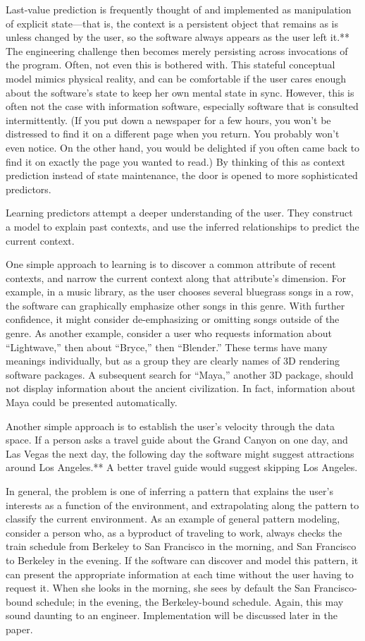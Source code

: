 {Last-value prediction is frequently thought of and implemented as manipulation of explicit state—that is, the context is a persistent object that remains as is unless changed by the user, so the software always appears as the user left it.** The engineering challenge then becomes merely persisting across invocations of the program. Often, not even this is bothered with. This stateful conceptual model mimics physical reality, and can be comfortable if the user cares enough about the software’s state to keep her own mental state in sync. However, this is often not the case with information software, especially software that is consulted intermittently. (If you put down a newspaper for a few hours, you won’t be distressed to find it on a different page when you return. You probably won’t even notice. On the other hand, you would be delighted if you often came back to find it on exactly the page you wanted to read.) By thinking of this as context prediction instead of state maintenance, the door is opened to more sophisticated predictors.

Learning predictors attempt a deeper understanding of the user. They construct a model to explain past contexts, and use the inferred relationships to predict the current context.

One simple approach to learning is to discover a common attribute of recent contexts, and narrow the current context along that attribute’s dimension. For example, in a music library, as the user chooses several bluegrass songs in a row, the software can graphically emphasize other songs in this genre. With further confidence, it might consider de-emphasizing or omitting songs outside of the genre. As another example, consider a user who requests information about “Lightwave,” then about “Bryce,” then “Blender.” These terms have many meanings individually, but as a group they are clearly names of 3D rendering software packages. A subsequent search for “Maya,” another 3D package, should not display information about the ancient civilization. In fact, information about Maya could be presented automatically.

Another simple approach is to establish the user’s velocity through the data space. If a person asks a travel guide about the Grand Canyon on one day, and Las Vegas the next day, the following day the software might suggest attractions around Los Angeles.** A better travel guide would suggest skipping Los Angeles.

In general, the problem is one of inferring a pattern that explains the user’s interests as a function of the environment, and extrapolating along the pattern to classify the current environment. As an example of general pattern modeling, consider a person who, as a byproduct of traveling to work, always checks the train schedule from Berkeley to San Francisco in the morning, and San Francisco to Berkeley in the evening. If the software can discover and model this pattern, it can present the appropriate information at each time without the user having to request it. When she looks in the morning, she sees by default the San Francisco-bound schedule; in the evening, the Berkeley-bound schedule. Again, this may sound daunting to an engineer. Implementation will be discussed later in the paper.

}
